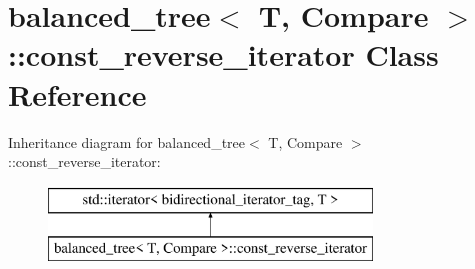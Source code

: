 \hypertarget{classbalanced__tree_1_1const__reverse__iterator}{\section{balanced\+\_\+tree$<$ T, Compare $>$\+:\+:const\+\_\+reverse\+\_\+iterator Class Reference}
\label{classbalanced__tree_1_1const__reverse__iterator}
}
Inheritance diagram for balanced\+\_\+tree$<$ T, Compare $>$\+:\+:const\+\_\+reverse\+\_\+iterator\+:\begin{figure}[H]
\begin{center}
\leavevmode
\includegraphics[height=2.000000cm]{classbalanced__tree_1_1const__reverse__iterator}
\end{center}
\end{figure}
